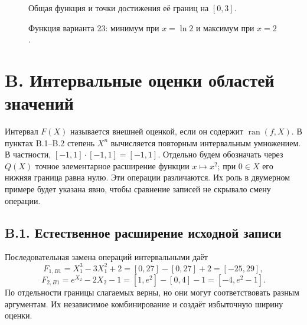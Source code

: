 \documentclass[12pt,a4paper]{article}
\newcommand{\ran}{\operatorname{ran}}
\begin{document}
\begin{figure}[H]\centering
{}
\caption{Общая функция и точки достижения её границ на $[0,3]$.}
\end{figure}
\begin{figure}[H]\centering
{}
\caption{Функция варианта 23: минимум при $x=\ln2$ и максимум при $x=2$.}
\end{figure}

\section*{B. Интервальные оценки областей значений}
Интервал $F(X)$ называется внешней оценкой, если он содержит
$\ran(f,X)$. В пунктах B.1--B.2 степень $X^n$ вычисляется
повторным интервальным умножением.
В частности, $[-1,1]\cdot[-1,1]=[-1,1]$.
Отдельно будем обозначать через $Q(X)$ точное элементарное
расширение функции $x\mapsto x^2$; при $0\in X$ его нижняя граница
равна нулю. Эти операции различаются. Их роль в двумерном примере
будет указана явно, чтобы сравнение записей не скрывало смену операции.

\subsection*{B.1. Естественное расширение исходной записи}
Последовательная замена операций интервальными даёт
\[
F_{1,B1}=X_1^3-3X_1^2+2=[0,27]-[0,27]+2=[-25,29],
\]
\[
F_{2,B1}=e^{X_2}-2X_2-1=[1,e^2]-[0,4]-1=[-4,e^2-1].
\]
По отдельности границы слагаемых верны, но они могут соответствовать
разным аргументам. Их независимое комбинирование и создаёт избыточную
ширину оценки.
\end{document}
